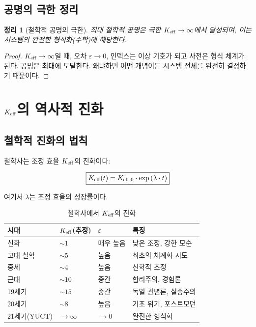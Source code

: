 \documentclass[11pt,a4paper]{article}
\newtheorem{theorem}{정리}[section]
\newcommand{\eps}{\varepsilon}
\begin{document}
	\subsection{공명의 극한 정리}
	
	\begin{theorem}[철학적 공명의 극한]
		최대 철학적 공명은 극한 \(\Keff \to \infty\)에서 달성되며, 이는 시스템의 완전한 형식화(수학)에 해당한다.
	\end{theorem}
	
	\begin{proof}
		\(\Keff \to \infty\)일 때, 오차 \(\eps \to 0\), 인덱스는 이상 기호가 되고 사전은 형식 체계가 된다. 공명은 최대에 도달한다. 왜냐하면 어떤 개념이든 시스템 전체를 완전히 결정하기 때문이다.
	\end{proof}
	
	\section{\texorpdfstring{\(\Keff\)}{K\_eff}의 역사적 진화}
	
	\subsection{철학적 진화의 법칙}
	
	철학사는 조정 효율 \(\Keff\)의 진화이다:
	
	\begin{equation}
		\boxed{
			\Keff(t) = \Keff[0] \cdot \exp\left(\lambda \cdot t\right)
		}
	\end{equation}
	
	여기서 \(\lambda\)는 조정 효율의 성장률이다.
	
	\begin{table}[H]
		\centering
		\caption{철학사에서 \(\Keff\)의 진화}
		\begin{tabular}{p{3cm}p{3cm}p{3cm}p{4cm}}
			\toprule
			\textbf{시대} & \(\Keff\)(추정) & \(\eps\) & \textbf{특징} \\
			\midrule
			신화 & \(\sim 1\) & 매우 높음 & 낮은 조정, 강한 모순 \\
			고대 철학 & \(\sim 5\) & 높음 & 최초의 체계화 시도 \\
			중세 & \(\sim 4\) & 높음 & 신학적 조정 \\
			근대 & \(\sim 10\) & 중간 & 합리주의, 경험론 \\
			19세기 & \(\sim 15\) & 중간 & 독일 관념론, 실증주의 \\
			20세기 & \(\sim 8\) & 높음 & 기초 위기, 포스트모던 \\
			21세기(YUCT) & \(\to \infty\) & \(\to 0\) & 완전한 형식화 \\
			\bottomrule
		\end{tabular}
	\end{table}
	
\end{document}
